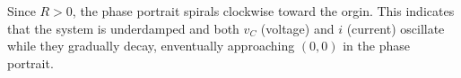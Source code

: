 \documentclass[preview]{standalone}
\begin{document}
\begin{center}
\raggedright
                    Since $R > 0$, the phase portrait spirals clockwise toward the orgin. This indicates
                    that the system is underdamped and both $v_C$ (voltage) and $i$ (current) oscillate 
                    while they gradually decay, enventually approaching $(0,0)$ in the phase portrait.
\end{center}
\end{document}
